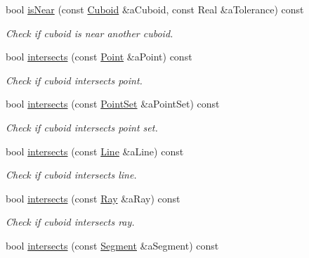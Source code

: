 \begin{DoxyCompactItemize}
bool \hyperlink{classlibrary_1_1math_1_1geom_1_1d3_1_1objects_1_1_cuboid_ada78cbdc903bb25289a981d13ae2d2c5}{is\+Near} (const \hyperlink{classlibrary_1_1math_1_1geom_1_1d3_1_1objects_1_1_cuboid}{Cuboid} \&a\+Cuboid, const Real \&a\+Tolerance) const
\begin{DoxyCompactList}\small\item\em Check if cuboid is near another cuboid. \end{DoxyCompactList}\item 
bool \hyperlink{classlibrary_1_1math_1_1geom_1_1d3_1_1objects_1_1_cuboid_ae83063d3b6416b327b6a297f322e2cd1}{intersects} (const \hyperlink{classlibrary_1_1math_1_1geom_1_1d3_1_1objects_1_1_point}{Point} \&a\+Point) const
\begin{DoxyCompactList}\small\item\em Check if cuboid intersects point. \end{DoxyCompactList}\item 
bool \hyperlink{classlibrary_1_1math_1_1geom_1_1d3_1_1objects_1_1_cuboid_ac860b7abc830867b23019f37463334ac}{intersects} (const \hyperlink{classlibrary_1_1math_1_1geom_1_1d3_1_1objects_1_1_point_set}{Point\+Set} \&a\+Point\+Set) const
\begin{DoxyCompactList}\small\item\em Check if cuboid intersects point set. \end{DoxyCompactList}\item 
bool \hyperlink{classlibrary_1_1math_1_1geom_1_1d3_1_1objects_1_1_cuboid_a39646697bbc1c0598cf985faad5cd582}{intersects} (const \hyperlink{classlibrary_1_1math_1_1geom_1_1d3_1_1objects_1_1_line}{Line} \&a\+Line) const
\begin{DoxyCompactList}\small\item\em Check if cuboid intersects line. \end{DoxyCompactList}\item 
bool \hyperlink{classlibrary_1_1math_1_1geom_1_1d3_1_1objects_1_1_cuboid_a1faf168d7d2f4879c27bc4723da03aa4}{intersects} (const \hyperlink{classlibrary_1_1math_1_1geom_1_1d3_1_1objects_1_1_ray}{Ray} \&a\+Ray) const
\begin{DoxyCompactList}\small\item\em Check if cuboid intersects ray. \end{DoxyCompactList}\item 
bool \hyperlink{classlibrary_1_1math_1_1geom_1_1d3_1_1objects_1_1_cuboid_af171e9e8e392905f42e004ab1c8d5972}{intersects} (const \hyperlink{classlibrary_1_1math_1_1geom_1_1d3_1_1objects_1_1_segment}{Segment} \&a\+Segment) const

\end{DoxyCompactItemize}
